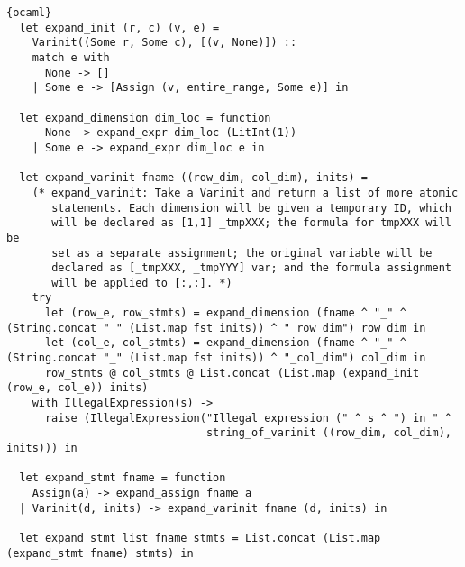 \begin{lstlisting}{ocaml}
  let expand_init (r, c) (v, e) =
    Varinit((Some r, Some c), [(v, None)]) ::
    match e with
      None -> []
    | Some e -> [Assign (v, entire_range, Some e)] in

  let expand_dimension dim_loc = function
      None -> expand_expr dim_loc (LitInt(1))
    | Some e -> expand_expr dim_loc e in

  let expand_varinit fname ((row_dim, col_dim), inits) =
    (* expand_varinit: Take a Varinit and return a list of more atomic
       statements. Each dimension will be given a temporary ID, which
       will be declared as [1,1] _tmpXXX; the formula for tmpXXX will be
       set as a separate assignment; the original variable will be
       declared as [_tmpXXX, _tmpYYY] var; and the formula assignment
       will be applied to [:,:]. *)
    try
      let (row_e, row_stmts) = expand_dimension (fname ^ "_" ^ (String.concat "_" (List.map fst inits)) ^ "_row_dim") row_dim in
      let (col_e, col_stmts) = expand_dimension (fname ^ "_" ^ (String.concat "_" (List.map fst inits)) ^ "_col_dim") col_dim in
      row_stmts @ col_stmts @ List.concat (List.map (expand_init (row_e, col_e)) inits)
    with IllegalExpression(s) ->
      raise (IllegalExpression("Illegal expression (" ^ s ^ ") in " ^
                               string_of_varinit ((row_dim, col_dim), inits))) in

  let expand_stmt fname = function
    Assign(a) -> expand_assign fname a
  | Varinit(d, inits) -> expand_varinit fname (d, inits) in

  let expand_stmt_list fname stmts = List.concat (List.map (expand_stmt fname) stmts) in


\end{lstlisting}
